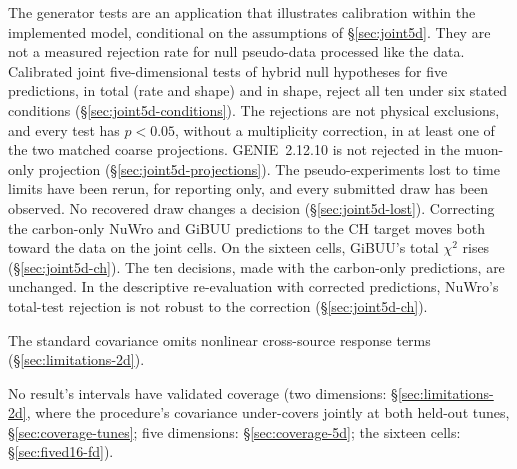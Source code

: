 The generator tests are an application that illustrates calibration within the implemented model, conditional on the assumptions of \S\ref{sec:joint5d}. They are not a measured rejection rate for null pseudo-data processed like the data. Calibrated joint five-dimensional tests of hybrid null hypotheses for five predictions, in total (rate and shape) and in shape, reject all ten under six stated conditions (\S\ref{sec:joint5d-conditions}). The rejections are not physical exclusions, and every test has $p<0.05$, without a multiplicity correction, in at least one of the two matched coarse projections. GENIE~2.12.10 is not rejected in the muon-only projection (\S\ref{sec:joint5d-projections}). The pseudo-experiments lost to time limits have been rerun, for reporting only, and every submitted draw has been observed. No recovered draw changes a decision (\S\ref{sec:joint5d-lost}). Correcting the carbon-only NuWro and GiBUU predictions to the CH target moves both toward the data on the joint cells. On the sixteen cells, GiBUU's total $\chi^{2}$ rises (\S\ref{sec:joint5d-ch}). The ten decisions, made with the carbon-only predictions, are unchanged. In the descriptive re-evaluation with corrected predictions, NuWro's total-test rejection is not robust to the correction (\S\ref{sec:joint5d-ch}).

The standard covariance omits nonlinear cross-source response terms (\S\ref{sec:limitations-2d}).

No result's intervals have validated coverage (two dimensions: \S\ref{sec:limitations-2d}, where the procedure's covariance under-covers jointly at both held-out tunes, \S\ref{sec:coverage-tunes}; five dimensions: \S\ref{sec:coverage-5d}; the sixteen cells: \S\ref{sec:fived16-fd}).
